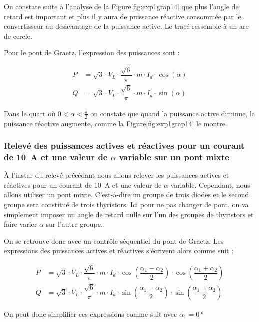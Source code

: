 \documentclass[a4paper, 11pt, openany, oneside, french]{article}
\begin{document}
On constate suite à l'analyse de la Figure\ref{fig:exp1grap14} que plus l'angle de retard est important et plus il y aura de puissance réactive consommée par le convertisseur au désavantage de la puissance active. Le tracé ressemble à un arc de cercle.

Pour le pont de Graetz, l'expression des puissances sont :

\begin{align*}
    P &= \sqrt{3} \cdot V_L \cdot \dfrac{\sqrt{6}}{\pi} \cdot m \cdot I_d \cdot \cos{\left(\alpha\right)}\\
    Q &= \sqrt{3} \cdot V_L \cdot \dfrac{\sqrt{6}}{\pi} \cdot m \cdot I_d \cdot \sin{\left(\alpha\right)}
\end{align*}

Dans le quart où $0 < \alpha < \frac{\pi}{2}$ on constate que quand la puissance active diminue, la puissance réactive augmente, comme la Figure\ref{fig:exp1grap14} le montre.

\subsubsection{Relevé des puissances actives et réactives pour un courant de \SI{10}{\ampere} et une valeur de $\alpha$ variable sur un pont mixte}
À l'instar du relevé précédant nous allons relever les puissances actives et réactives pour un courant de \SI{10}{\ampere} et une valeur de $\alpha$ variable. Cependant, nous allons utiliser un pont mixte. C'est-à-dire un groupe de trois diodes et le second groupe sera constitué de trois thyristors. Ici pour ne pas changer de pont, on va simplement imposer un angle de retard nulle sur l'un des groupes de thyristors et faire varier $\alpha$ sur l'autre groupe.

On se retrouve donc avec un contrôle séquentiel du pont de Graetz. Les expressions des puissances actives et réactives s'écrivent alors comme suit :

\begin{align*}
    P &= \sqrt{3} \cdot V_L \cdot \dfrac{\sqrt{6}}{\pi} \cdot m \cdot I_d \cdot \cos{\left(\dfrac{\alpha_1 - \alpha_2}{2}\right)} \cdot \cos{\left(\dfrac{\alpha_1 + \alpha_2}{2}\right)}\\
    Q &= \sqrt{3} \cdot V_L \cdot \dfrac{\sqrt{6}}{\pi} \cdot m \cdot I_d \cdot \sin{\left(\dfrac{\alpha_1 - \alpha_2}{2}\right)} \cdot \sin{\left(\dfrac{\alpha_1 + \alpha_2}{2}\right)}
\end{align*}

On peut donc simplifier ces expressions comme suit avec $\alpha_1 = \SI{0}{\degree}$
\end{document}
